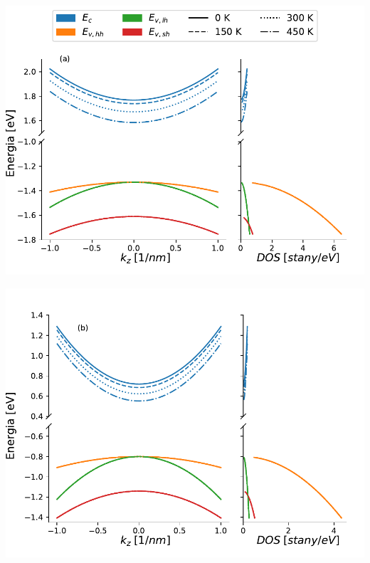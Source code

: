 \documentclass[12pt,openany,a4paper]{book}
\begin{document}
\begin{minipage}[t]{0.5\textwidth}
	\includegraphics[width = 1.05\linewidth]{Figures/band_str/AlAs.pdf}\label{fig:AlAs_bs}
\end{minipage}
\begin{minipage}[t]{0.5\textwidth}
	\includegraphics[width = 1.05\linewidth]{Figures/band_str/GaAs.pdf}\label{fig:GaAs_bs}
\end{minipage}
\end{document}
